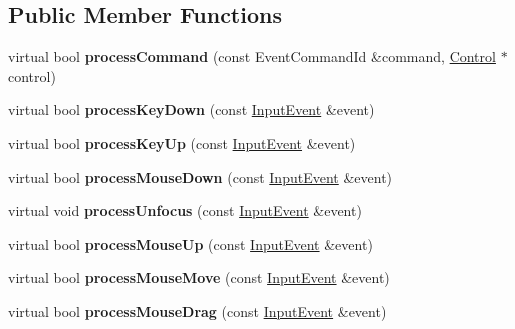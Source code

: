 \subsection*{Public Member Functions}
\begin{DoxyCompactItemize}
\item 
virtual bool {\bfseries process\+Command} (const Event\+Command\+Id \&command, \hyperlink{classControl}{Control} $\ast$control)\hypertarget{classEventResponder_aac5500c8e381375cbf714e926c77230b}{}\label{classEventResponder_aac5500c8e381375cbf714e926c77230b}

\item 
virtual bool {\bfseries process\+Key\+Down} (const \hyperlink{structInputEvent}{Input\+Event} \&event)\hypertarget{classEventResponder_a5dc846dde6aeb6e6bc261cf92a9341d2}{}\label{classEventResponder_a5dc846dde6aeb6e6bc261cf92a9341d2}

\item 
virtual bool {\bfseries process\+Key\+Up} (const \hyperlink{structInputEvent}{Input\+Event} \&event)\hypertarget{classEventResponder_a0ca7cdc9476b0814c2b5726c8806fe74}{}\label{classEventResponder_a0ca7cdc9476b0814c2b5726c8806fe74}

\item 
virtual bool {\bfseries process\+Mouse\+Down} (const \hyperlink{structInputEvent}{Input\+Event} \&event)\hypertarget{classEventResponder_a689e9eb7b3f075dfd19ba663fec0451d}{}\label{classEventResponder_a689e9eb7b3f075dfd19ba663fec0451d}

\item 
virtual void {\bfseries process\+Unfocus} (const \hyperlink{structInputEvent}{Input\+Event} \&event)\hypertarget{classEventResponder_ab434ad26278f99a7002e8ace5cae3412}{}\label{classEventResponder_ab434ad26278f99a7002e8ace5cae3412}

\item 
virtual bool {\bfseries process\+Mouse\+Up} (const \hyperlink{structInputEvent}{Input\+Event} \&event)\hypertarget{classEventResponder_ad616e1b2a5ba8f082bf750e3b10b8bcc}{}\label{classEventResponder_ad616e1b2a5ba8f082bf750e3b10b8bcc}

\item 
virtual bool {\bfseries process\+Mouse\+Move} (const \hyperlink{structInputEvent}{Input\+Event} \&event)\hypertarget{classEventResponder_a032ba2f0a13002708662b73fad412ec7}{}\label{classEventResponder_a032ba2f0a13002708662b73fad412ec7}

\item 
virtual bool {\bfseries process\+Mouse\+Drag} (const \hyperlink{structInputEvent}{Input\+Event} \&event)\hypertarget{classEventResponder_a2e23a9cc196342c3db715aace31c11d7}{}\label{classEventResponder_a2e23a9cc196342c3db715aace31c11d7}


\end{DoxyCompactItemize}
